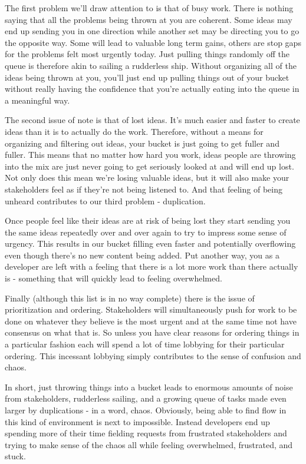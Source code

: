\documentclass[10pt,a5paper]{book}
\begin{document}
The first problem we'll draw attention to is that of busy work. There is nothing saying that all the problems being thrown at you are coherent. Some ideas may end up sending you in one direction while another set may be directing you to go the opposite way. Some will lead to valuable long term gains, others are stop gaps for the problems felt most urgently today. Just pulling things randomly off the queue is therefore akin to sailing a rudderless ship. Without organizing all of the ideas being thrown at you, you'll just end up pulling things out of your bucket without really having the confidence that you're actually eating into the queue in a meaningful way.

The second issue of note is that of lost ideas. It's much easier and faster to create ideas than it is to actually do the work. Therefore, without a means for organizing and filtering out ideas, your bucket is just going to get fuller and fuller. This means that no matter how hard you work, ideas people are throwing into the mix are just never going to get seriously looked at and will end up lost. Not only does this mean we're losing valuable ideas, but it will also make your stakeholders feel as if they're not being listened to. And that feeling of being unheard contributes to our third problem - duplication.

Once people feel like their ideas are at risk of being lost they start sending you the same ideas repeatedly over and over again to try to impress some sense of urgency. This results in our bucket filling even faster and potentially overflowing even though there's no new content being added. Put another way, you as a developer are left with a feeling that there is a lot more work than there actually is - something that will quickly lead to feeling overwhelmed.  

Finally (although this list is in no way complete) there is the issue of prioritization and ordering. Stakeholders will simultaneously push for work to be done on whatever they believe is the most urgent and at the same time not have consensus on what that is. So unless you have clear reasons for ordering things in a particular fashion each will spend a lot of time lobbying for their particular ordering. This incessant lobbying simply contributes to the sense of confusion and chaos. 

In short, just throwing things into a bucket leads to enormous amounts of noise from stakeholders, rudderless sailing, and a growing queue of tasks made even larger by duplications - in a word, chaos. Obviously, being able to find flow in this kind of environment is next to impossible. Instead developers end up spending more of their time fielding requests from frustrated stakeholders and trying to make sense of the chaos all while feeling overwhelmed, frustrated, and stuck. 
\end{document}
